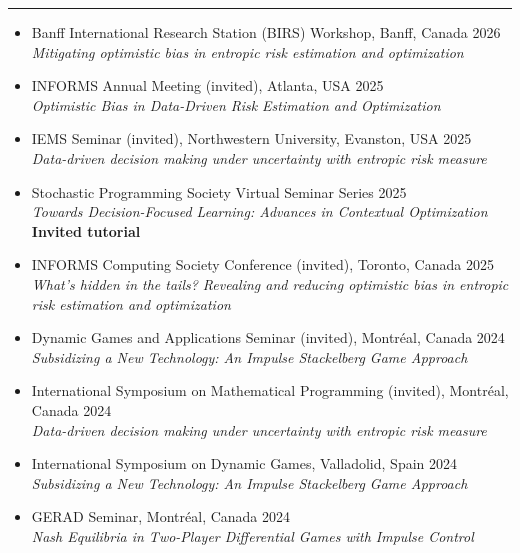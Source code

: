 \documentclass[12pt]{article}
\renewcommand{\section}[1]{
\vspace{0.25em}
\noindent{\normalfont\large\bfseries\color{black} #1}\par
\vspace{-0.24em}
\noindent\textcolor{black}{\rule{0.55\textwidth}{1.1pt}}
\vspace{0.48em}
}
\newenvironment{lonemidlist}[1][\enskip\textbullet]%
        {\begin{itemize}[#1,leftmargin=*,parsep=0pt,itemsep=5pt,topsep=2pt,partopsep=0pt]}
        {\end{itemize}\vspace{-.6\baselineskip}}
\begin{document}
\section{Talks and Seminars}
\begin{lonemidlist}
\item Banff International Research Station (BIRS) Workshop, Banff, Canada \hfill{2026}\\
\textit{Mitigating optimistic bias in entropic risk estimation and optimization}
\item INFORMS Annual Meeting (invited), Atlanta, USA \hfill{2025}\\
\textit{Optimistic Bias in Data-Driven Risk Estimation and Optimization}
\item IEMS Seminar (invited), Northwestern University, Evanston, USA \hfill{2025}\\
\textit{Data-driven decision making under uncertainty with entropic risk measure}
\item Stochastic Programming Society Virtual Seminar Series \hfill{2025}\\
\textit{Towards Decision-Focused Learning: Advances in Contextual Optimization}\\
\textbf{Invited tutorial}
\item INFORMS Computing Society Conference (invited), Toronto, Canada \hfill{2025}\\
\textit{What's hidden in the tails? Revealing and reducing optimistic bias in entropic risk estimation and optimization}
\item Dynamic Games and Applications Seminar (invited), Montréal, Canada \hfill{2024}\\
\textit{Subsidizing a New Technology: An Impulse Stackelberg Game Approach}
\item International Symposium on Mathematical Programming (invited), Montréal, Canada \hfill{2024}\\
\textit{Data-driven decision making under uncertainty with entropic risk measure}
\item  International Symposium on Dynamic Games, Valladolid, Spain
\hfill{2024}\\
\textit{Subsidizing a New Technology: An Impulse Stackelberg Game Approach}
\item GERAD Seminar, Montréal, Canada \hfill{2024}\\
\textit{Nash Equilibria in Two-Player Differential Games with Impulse Control}

\end{lonemidlist}
\end{document}
